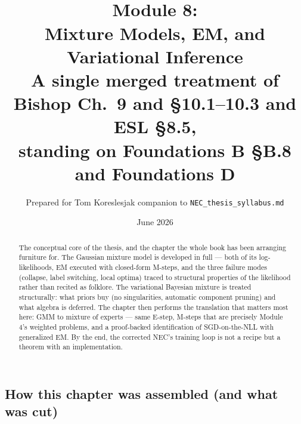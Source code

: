\documentclass[11pt]{article}
\title{\vspace{-1.2em}{\large\sffamily Foundations for a Quant Research Pipeline}\\[0.4em]
\textbf{Module 8:\\ Mixture Models, EM, and Variational Inference}\\[0.3em]
{\large A single merged treatment of Bishop Ch.\ 9 and \S10.1--10.3 and ESL \S8.5,\\ standing on Foundations B \S B.8 and Foundations D}}
\author{Prepared for Tom Koreslesjak \;\textperiodcentered\; companion to \texttt{NEC\_thesis\_syllabus.md}}
\date{June 2026}
\numberwithin{equation}{section}
\theoremstyle{plain}
\theoremstyle{definition}
\theoremstyle{remark}
\begin{document}
\maketitle
\vspace{-1.5em}

\begin{abstract}
\noindent The conceptual core of the thesis, and the chapter the whole book has been arranging furniture for. The Gaussian mixture model is developed in full --- both of its log-likelihoods, EM executed with closed-form M-steps, and the three failure modes (collapse, label switching, local optima) traced to structural properties of the likelihood rather than recited as folklore. The variational Bayesian mixture is treated structurally: what priors buy (no singularities, automatic component pruning) and what algebra is deferred. The chapter then performs the translation that matters most here: GMM to mixture of experts --- same E-step, M-steps that are precisely Module 4's weighted problems, and a proof-backed identification of SGD-on-the-NLL with generalized EM. By the end, the corrected NEC's training loop is not a recipe but a theorem with an implementation.
\end{abstract}

\tableofcontents

\subsection*{How this chapter was assembled (and what was cut)}
\end{document}
